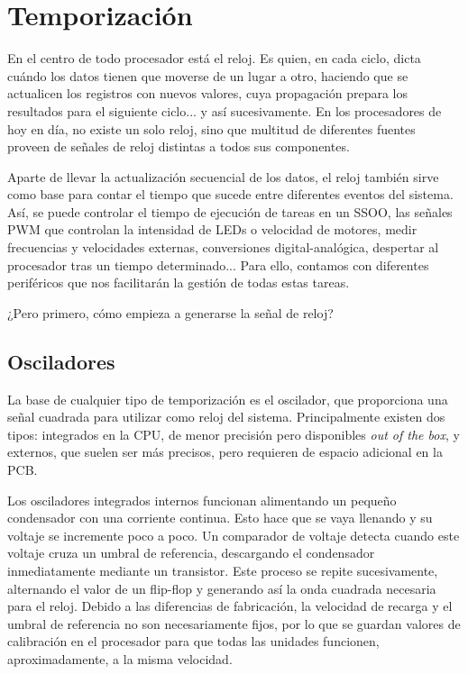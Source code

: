 \documentclass[../main.tex]{subfiles}
\begin{document}
\section{Temporización}

    En el centro de todo procesador está el reloj. Es quien, en cada ciclo, dicta cuándo los datos tienen que moverse de un lugar a otro, haciendo que se actualicen los registros con nuevos valores, cuya propagación prepara los resultados para el siguiente ciclo... y así sucesivamente. En los procesadores de hoy en día, no existe un solo reloj, sino que multitud de diferentes fuentes proveen de señales de reloj distintas a todos sus componentes.

    Aparte de llevar la actualización secuencial de los datos, el reloj también sirve como base para contar el tiempo que sucede entre diferentes eventos del sistema. Así, se puede controlar el tiempo de ejecución de tareas en un SSOO, las señales PWM que controlan la intensidad de LEDs o velocidad de motores, medir frecuencias y velocidades externas, conversiones digital-analógica, despertar al procesador tras un tiempo determinado... Para ello, contamos con diferentes periféricos que nos facilitarán la gestión de todas estas tareas.

    ¿Pero primero, cómo empieza a generarse la señal de reloj?

    \subsection{Osciladores}

        La base de cualquier tipo de temporización es el oscilador, que proporciona una señal cuadrada para utilizar como reloj del sistema. Principalmente existen dos tipos: integrados en la CPU, de menor precisión pero disponibles \emph{out of the box}, y externos, que suelen ser más precisos, pero requieren de espacio adicional en la PCB.

        Los osciladores integrados internos funcionan alimentando un pequeño condensador con una corriente continua. Esto hace que se vaya llenando y su voltaje se incremente poco a poco. Un comparador de voltaje detecta cuando este voltaje cruza un umbral de referencia, descargando el condensador inmediatamente mediante un transistor. Este proceso se repite sucesivamente, alternando el valor de un flip-flop y generando así la onda cuadrada necesaria para el reloj. Debido a las diferencias de fabricación, la velocidad de recarga y el umbral de referencia no son necesariamente fijos, por lo que se guardan valores de calibración en el procesador para que todas las unidades funcionen, aproximadamente, a la misma velocidad.
\end{document}
